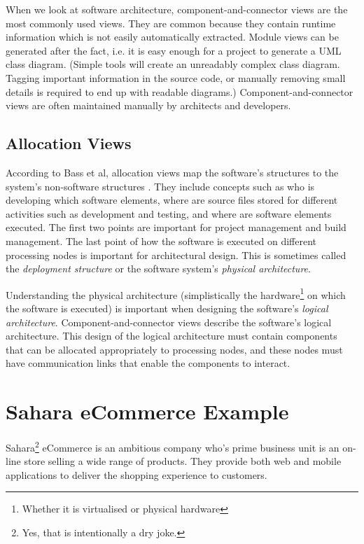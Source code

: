 When we look at software architecture, component-and-connector views are the most commonly used views.
They are common because they contain runtime information which is not easily automatically extracted.
Module views can be generated after the fact, i.e. it is easy enough for a project to generate a UML class diagram.
(Simple tools will create an unreadably complex class diagram.
Tagging important information in the source code, or manually removing small details is required to end up with readable diagrams.)
Component-and-connector views are often maintained manually by architects and developers.

\subsection{Allocation Views}
According to Bass et al, allocation views map the software's structures to the system's non-software structures \cite{bass2021software}.
They include concepts such as who is developing which software elements,
where are source files stored for different activities such as development and testing,
and where are software elements executed.
The first two points are important for project management and build management.
The last point of how the software is executed on different processing nodes is important for architectural design.
This is sometimes called the \emph{deployment structure} or the software system's \emph{physical architecture}.

Understanding the physical architecture (simplistically the hardware\footnote{Whether it is virtualised or physical hardware}
on which the software is executed) is important when designing the software's \emph{logical architecture}.
Component-and-connector views describe the software's logical architecture.
This design of the logical architecture must contain components that can be allocated appropriately to processing nodes,
and these nodes must have communication links that enable the components to interact.

\section{Sahara eCommerce Example}\label{sec:storeExample}
Sahara\footnote{Yes, that is intentionally a dry joke.} eCommerce is an ambitious company who's prime business unit is an on-line store selling a wide range of products.
They provide both web and mobile applications to deliver the shopping experience to customers.


